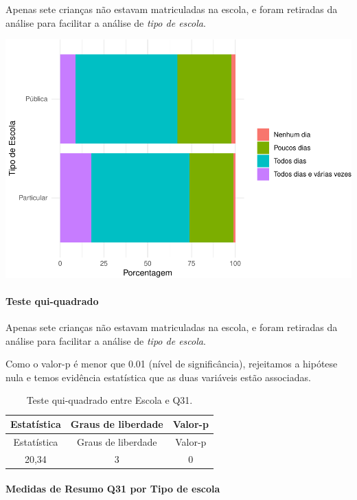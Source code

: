 \documentclass[]{article}
\let\oldparagraph\paragraph
\renewcommand{\paragraph}[1]{\oldparagraph{#1}\mbox{}}
\begin{document}
Apenas sete crianças não estavam matriculadas na escola, e foram retiradas da análise para facilitar a análise de \emph{tipo de escola}.

\begin{center}\includegraphics[width=0.75\linewidth]{relatorio_covid19_files/figure-latex/unnamed-chunk-1057-1} \end{center}

\hypertarget{teste-qui-quadrado-91}{%
\paragraph{Teste qui-quadrado}\label{teste-qui-quadrado-91}}

Apenas sete crianças não estavam matriculadas na escola, e foram retiradas da análise para facilitar a análise de \emph{tipo de escola}.

Como o valor-p é menor que 0.01 (nível de significância), rejeitamos a hipótese nula e temos evidência estatística que as duas variáveis estão associadas.

\begin{longtable}[]{@{}ccc@{}}
\caption{\label{tab:unnamed-chunk-1059}Teste qui-quadrado entre Escola e Q31.}\tabularnewline
\toprule
Estatística & Graus de liberdade & Valor-p\tabularnewline
\midrule
\endfirsthead
\toprule
Estatística & Graus de liberdade & Valor-p\tabularnewline
\midrule
\endhead
20,34 & 3 & 0\tabularnewline
\bottomrule
\end{longtable}

\cleardoublepage

\hypertarget{medidas-de-resumo-q31-por-tipo-de-escola}{%
\paragraph{Medidas de Resumo Q31 por Tipo de escola}\label{medidas-de-resumo-q31-por-tipo-de-escola}}
\end{document}
